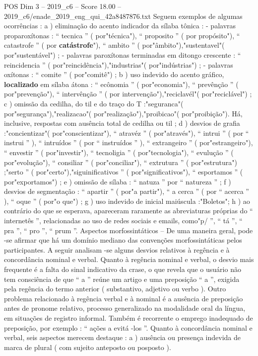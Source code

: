 \begin{textsample}{POS Dim 3 – 2019\_c6 – Score 18.00 – 2019\_c6/enade\_2019\_eng\_qui\_42a8487876.txt}
Seguem exemplos de algumas ocorrências : a ) eliminação do acento indicador da sílaba tônica : - palavras proparoxítonas : “ tecnica ” ( por"técnica"), “ proposito ” ( por propósito"), “ catastrofe ” ( por \textbf{catástrofe}"), “ ambito ” ( por"âmbito"),"sustentavel"( por"sustentável") ; - palavras paroxítonas terminadas em ditongo crescente : “ reincidencia ” ( por"reincidência"),"industrias"( por"indústrias") ; - palavras oxítonas : “ comite ” ( por"comitê") ; b ) uso indevido do acento gráfico, \textbf{localizado} em sílaba átona : “ ecônomia ” ( por"economia"), “ prevênção ” ( por"prevenção"), “ intervênção ” ( por intervenção"),"reciclavél"( por"reciclável") ; c ) omissão da cedilha, do til e do traço do T :"seguranca"( por"segurança"),"realizacao"( por"realização"),"proibicao"( por"proibição").
Há, inclusive, respostas com ausência total de cedilha ou til ; d ) desvios de grafia :"concientizar"( por"conscientizar"), “ atravéz ” ( por"através"), “ intrui ” ( por “ instrui ” ), “ intruídos ” ( por “ instruídos ” ), “ extrangeiro ” ( por"estrangeiro"), “ envestir ” ( por"investir"), “ tecnoligia ” ( por"tecnologia"), “ evulução ” ( por"evolução"), “ consiliar ” ( por"conciliar"), “ extrutura ” ( por"estrutura") ;"serto ” ( por"certo"),"siguinificativos ” ( por"significativos"), “ esportamos ” ( por"exportamos") ; e ) omissão de sílaba : “ natuza ” por “ natureza ” ; f ) desvios de segmentação : “ apartir ” ( por"a partir"), “ a cerca ” ( por “ acerca ” ), “ oque ” ( por"o que") ; g ) uso indevido de inicial maiúscula :"Boletos"; h ) ao contrário do que se esperava, apareceram raramente as abreviaturas próprias do “ internetês ”, relacionadas ao uso de redes sociais e emails, como"p/ ”, “ tá ”, “ pra ”, “ pro ”, “ prum ”.
Aspectos morfossintáticos – De uma maneira geral, pode -se afirmar que há um domínio mediano das convenções morfossintáticas pelos participantes.
A seguir analisam -se alguns desvios relativos à regência e à concordância nominal e verbal.
Quanto à regência nominal e verbal, o desvio mais frequente é a falta do sinal indicativo da crase, o que revela que o usuário não tem consciência de que “ a ” reúne um artigo e uma preposição “ a ”, exigida pela regência do termo anterior ( substantivo, adjetivo ou verbo ).
Outro problema relacionado à regência verbal e à nominal é a ausência de preposição antes de pronome relativo, processo generalizado na modalidade oral da língua, em situações de registro informal.
Também é recorrente o emprego inadequado de preposição, por exemplo : “ ações a evitá -los ”.
Quanto à concordância nominal e verbal, seis aspectos merecem destaque : a ) ausência ou presença indevida de marca de plural ( com sujeito anteposto ou posposto ).

\end{textsample}
